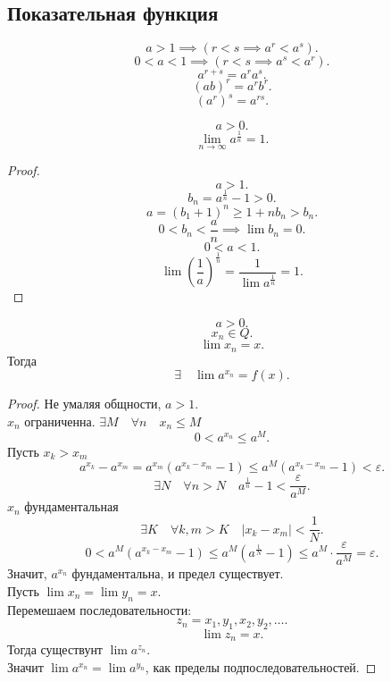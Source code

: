 \documentclass[11pt, oneside]{article}   	%
\begin{document}
    \subsection{Показательная функция}
    \[ a > 1 \implies \left( r < s \implies a^{r} < a^{s} \right)  .\]
    \[ 0 < a < 1 \implies \left( r < s \implies a^{s} < a^{r} \right)  .\]
    \[ a^{r+s} = a^{r}a^{s} .\]
    \[ (ab)^{r} = a^{r}b^{r} .\]
    \[ (a^{r})^{s} = a^{rs} .\]
    \begin{theorem}
        \[ a > 0.\]
        \[ \lim\limits_{n \to \infty} a^{\frac{1}{n}} = 1 .\]
        \begin{proof}
            \[ a > 1 .\] 
            \[ b_n = a^{\frac{1}{n}}-1 > 0 .\]
            \[ a = (b_1 + 1)^{n} \ge  1 + nb_n > b_n .\]
            \[ 0 < b_n < \frac{a}{n} \implies \lim b_n = 0 .\]
            \[ 0 < a < 1 .\]
            \[ \lim \left( \frac{1}{a} \right)^{\frac{1}{n}} = \frac{1}{\lim a^{\frac{1}{n}}} = 1  .\] 
        \end{proof}
    \end{theorem}
    \begin{theorem}
        \[ a > 0 .\]
        \[ x_n\in Q .\]
        \[ \lim x_n = x .\]
        Тогда
        \[ \exists{}\quad \lim a^{x_n} = f(x) .\]
        \begin{proof}
            Не умаляя общности, $a>1$.\\
            $x_n$ ограниченна. $\exists{M}\quad \forall{n}\quad x_n \le M  $
            \[ 0 < a^{x_n} \le a^{M}.\] 
            Пусть $x_k > x_m$
            \[ a^{x_k} - a^{x_m} = a^{x_m}(a^{x_k-x_m}-1) \le a^{M}\left( a^{x_k-x_m} -1 \right) < \varepsilon  .\]
            \[ \exists{N}\quad \forall{n>N}\quad a^{\frac{1}{n}}-1 < \frac{\varepsilon}{a^{M}} .\]
            $x_n$ фундаментальная
            \[ \exists{K}\quad \forall{k,m>K}\quad |x_k-x_m|<\frac{1}{N}   .\]
            \[ 0 < a^{M}\left( a^{x_k-x_m}-1 \right) \le a^{M}\left(a^{\frac{1}{N}} - 1\right) \le a^{M} \cdot \frac{\varepsilon}{a^{M}} = \varepsilon .\]
            Значит, $a^{x_n}$ фундаментальна, и предел существует.\\
            Пусть $\lim x_n = \lim y_n = x$.\\
            Перемешаем последовательности:
            \[ z_n = x_1, y_1, x_2, y_2, \ldots .\]
            \[ \lim z_n = x .\]
            Тогда существунт $\lim a^{z_n}$.\\
            Значит $\lim a^{x_n} = \lim a^{y_n}$, как пределы подпоследовательностей.
        \end{proof}
    \end{theorem}
\end{document}
